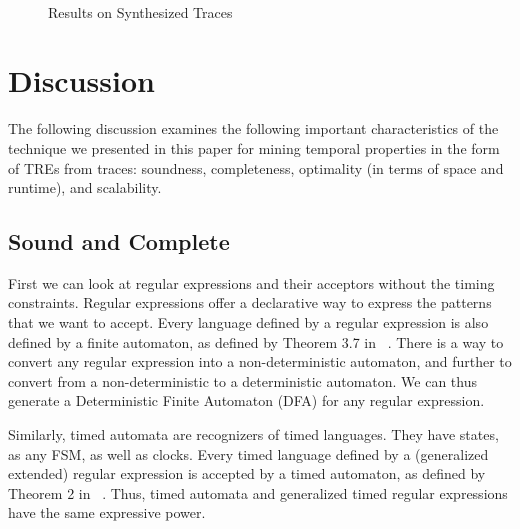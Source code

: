 \documentclass[]{sigplanconf}
\begin{document}
\begin{figure}
  \centering
  \\
  \caption{Results on Synthesized Traces}
\end{figure}


\section{Discussion} \label{discussion}

The following discussion examines the following important characteristics of the technique we presented in this paper for mining temporal properties in the form of TREs from traces: soundness, completeness, optimality (in terms of space and runtime), and scalability.


\subsection{Sound and Complete}



First we can look at regular expressions and their acceptors without the timing constraints. Regular expressions offer a declarative way to express the patterns that we want to accept. Every language defined by a regular expression is also defined by a finite automaton, as defined by Theorem 3.7 in ~\cite{book1}. There is a way to convert any regular expression into a non-deterministic automaton, and further to convert from a non-deterministic to a deterministic automaton. We can thus generate a Deterministic Finite Automaton (DFA) for any regular expression.

Similarly, timed automata are recognizers of timed languages. They have states, as any FSM, as well as clocks. Every timed language defined by a (generalized extended) regular expression is accepted by a timed automaton, as defined by Theorem 2 in ~\cite{timedregex}. Thus, timed automata and generalized timed regular expressions have the same expressive power.
\end{document}
